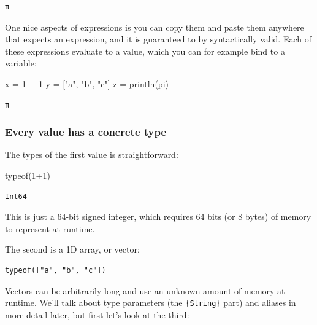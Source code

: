 \documentclass[
]{article}
\newenvironment{Shaded}{\begin{snugshade}}{\end{snugshade}}
\newcommand{\ConstantTok}[1]{\textcolor[rgb]{0.56,0.35,0.01}{#1}}
\newcommand{\FloatTok}[1]{\textcolor[rgb]{0.68,0.00,0.00}{#1}}
\newcommand{\FunctionTok}[1]{\textcolor[rgb]{0.28,0.35,0.67}{#1}}
\newcommand{\NormalTok}[1]{\textcolor[rgb]{0.00,0.23,0.31}{#1}}
\newcommand{\OperatorTok}[1]{\textcolor[rgb]{0.37,0.37,0.37}{#1}}
\newcommand{\StringTok}[1]{\textcolor[rgb]{0.13,0.47,0.30}{#1}}
\begin{document}
\begin{verbatim}
π
\end{verbatim}

One nice aspects of expressions is you can copy them and paste them
anywhere that expects an expression, and it is guaranteed to by
syntactically valid. Each of these expressions evaluate to a value,
which you can for example bind to a variable:

\begin{Shaded}
\begin{Highlighting}[]
\NormalTok{x }\OperatorTok{=} \FloatTok{1} \OperatorTok{+} \FloatTok{1}
\NormalTok{y }\OperatorTok{=}\NormalTok{ [}\StringTok{"a"}\NormalTok{, }\StringTok{"b"}\NormalTok{, }\StringTok{"c"}\NormalTok{]}
\NormalTok{z }\OperatorTok{=} \FunctionTok{println}\NormalTok{(}\ConstantTok{pi}\NormalTok{)}
\end{Highlighting}
\end{Shaded}

\begin{verbatim}
π
\end{verbatim}

\subsubsection{Every value has a concrete
type}\label{every-value-has-a-concrete-type}

The types of the first value is straightforward:

\begin{Shaded}
\begin{Highlighting}[]
\FunctionTok{typeof}\NormalTok{(}\FloatTok{1}\OperatorTok{+}\FloatTok{1}\NormalTok{)}
\end{Highlighting}
\end{Shaded}

\begin{verbatim}
Int64
\end{verbatim}

This is just a 64-bit signed integer, which requires 64 bits (or 8
bytes) of memory to represent at runtime.

The second is a 1D array, or vector:

\begin{verbatim}
typeof(["a", "b", "c"])
\end{verbatim}

Vectors can be arbitrarily long and use an unknown amount of memory at
runtime. We'll talk about type parameters (the \texttt{\{String\}} part)
and aliases in more detail later, but first let's look at the third:
\end{document}
